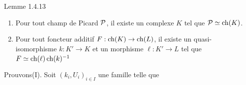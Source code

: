 \documentclass[10pt]{../fichiers-configuration-latex/smfart}
\begin{document}
\begin{enonce*}{Lemme 1.4.13}
\begin{enumerate}
\renewcommand{\theenumi}{\Roman{enumi}}
\renewcommand{\labelenumi}{(\theenumi)}
\item Pour tout champ de Picard ${\mathcal P}$, il existe un complexe
$K$ tel que ${\mathcal P}\simeq\operatorname{ch}(K)$.

\item Pour tout foncteur additif $F:\operatorname{ch}(K)\rightarrow \operatorname{ch}(L)$, il
existe un quasi-isomorphisme $k:K'\rightarrow K$ et un morphisme
$\ell:K'\rightarrow L$ tel que $F\simeq \operatorname{ch}(\ell)\operatorname{ch}(k)^{-1}$
\end{enumerate}
\end{enonce*}

Prouvons\pageoriginale (I). Soit $(k_{i},U_{i})_{i\in I}$ une famille
telle que 
\end{document}
